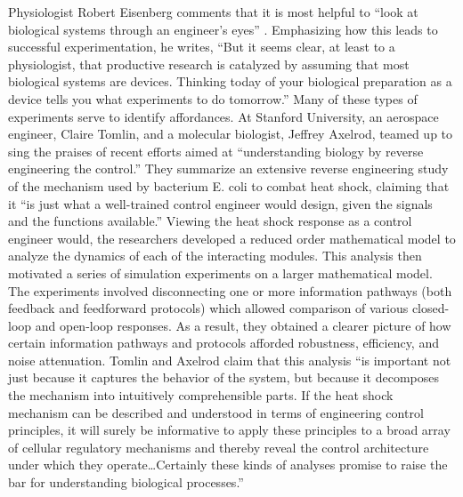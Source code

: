 Physiologist Robert Eisenberg comments that it is most helpful to “look
at biological systems through an engineer’s eyes” \citep[][pg. 376]{eisenberg2007}.
Emphasizing how this leads to successful experimentation, he writes,
“But it seems clear, at least to a physiologist, that productive
research is catalyzed by assuming that most biological systems are
devices. Thinking today of your biological preparation as a device
tells you what experiments to do tomorrow.” Many of these types of
experiments serve to identify affordances. At Stanford University, an
aerospace engineer, Claire Tomlin, and a molecular biologist, Jeffrey
Axelrod, teamed up to sing the praises of recent efforts aimed at
``understanding biology by reverse engineering the
control.''\citep[][pgs. 4219--4220]{tomlinaxelrod2005} They summarize an extensive reverse
engineering study of the mechanism used by bacterium E. coli to combat
heat shock,\citep{elsamadetal2005} claiming that it “is just what a
well-trained control engineer would design, given the signals and the
functions available.” Viewing the heat shock response as a control
engineer would, the researchers developed a reduced order mathematical
model to analyze the dynamics of each of the interacting modules. This
analysis then motivated a series of simulation experiments on a larger
mathematical model. The experiments involved disconnecting one or more
information pathways (both feedback and feedforward protocols) which
allowed comparison of various closed-loop and open-loop responses. As a
result, they obtained a clearer picture of how certain information
pathways and protocols afforded robustness, efficiency, and noise
attenuation. Tomlin and Axelrod claim that this analysis “is important
not just because it captures the behavior of the system, but because it
decomposes the mechanism into intuitively comprehensible parts. If the
heat shock mechanism can be described and understood in terms of
engineering control principles, it will surely be informative to apply
these principles to a broad array of cellular regulatory mechanisms and
thereby reveal the control architecture under which they
operate{\ldots}Certainly these kinds of analyses promise to raise the bar for
understanding biological processes.”

